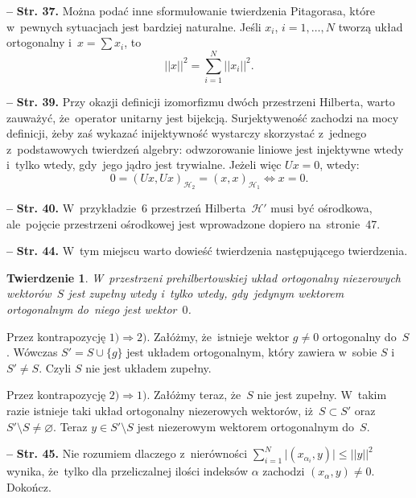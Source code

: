 \documentclass[a4paper,11pt]{article}
\newtheorem{twr}{Twierdzenie}
\let\emptyset\varnothing
\newcommand{\ld}{\ldots}
\newcommand{\mc}{\mathcal}
\newcommand{\Ra}{\Rightarrow}
\newcommand{\wtw}{wtedy i~tylko wtedy}
\newcommand{\al}{\alpha}
\newcommand{\Hc}{\mc{H}}
\newcommand{\set}[1]{\{ #1 \}}
\newcommand{\es}{\emptyset}
\newcommand{\subs}{\subset}
\newcommand{\setm}{\setminus}
\newcommand{\Sum}{\sum\limits}
\providecommand{\absj}[1]{\lvert #1 \rvert}
\newcommand{\norm}[1]{\left|\left| #1 \right|\right|}
\newcommand{\tb}{\textbf}
\newcommand{\noi}{\noindent}
\newcommand{\start}{\noi \tb{--} {}}
\newcommand{\Str}[1]{\tb{Str. #1.}}
\newcommand{\Dok}{{\color{red} Dokończ.}}
\begin{document}
\start \Str{37} Można podać inne sformułowanie twierdzenia Pitagorasa,
które w~pewnych sytuacjach jest bardziej naturalne. Jeśli $x_{ i }$,
$i = 1, \ld, N$ tworzą układ ortogonalny i~$x = \Sum x_{ i }$, to
\begin{displaymath}
  \norm{ x }^{ 2 } = \Sum_{ i = 1 }^{ N } \norm{ x_{ i } }^{ 2 }.
\end{displaymath}


\start \Str{39} Przy okazji definicji izomorfizmu dwóch przestrzeni
Hilberta, warto zauważyć, że~operator unitarny jest bijekcją.
Surjektyweność zachodzi na mocy definicji, żeby zaś wykazać
inijektywność wystarczy skorzystać z~jednego z~podstawowych twierdzeń
algebry: odwzorowanie liniowe jest injektywne \wtw, gdy~jego jądro
jest trywialne. Jeżeli więc $Ux = 0$, wtedy:
\begin{displaymath}
  0 = ( Ux, Ux )_{ \Hc_{ 2 } } = ( x, x )_{ \Hc_{ 1 } } \iff x = 0.
\end{displaymath}


\start \Str{40} W~przykładzie~6 przestrzeń Hilberta~$\Hc'$ musi być ośrodkowa, ale~pojęcie przestrzeni ośrodkowej jest wprowadzone dopiero na~stronie~47.


\start \Str{44} W~tym miejscu warto dowieść twierdzenia następującego
twierdzenia.
\begin{twr}
  W~przestrzeni prehilbertowskiej układ ortogonalny niezerowych
  wektorów~$S$ jest zupełny \wtw, gdy~jedynym wektorem ortogonalnym
  do~niego jest wektor~$0$.
\end{twr}

Przez kontrapozycję $1) \Ra 2)$. Załóżmy, że~istnieje wektor
$g \neq 0$ ortogonalny do~$S$. Wówczas $S' = S \cup \set{ g }$ jest
układem ortogonalnym, który zawiera w~sobie $S$ i~$S' \neq S$. Czyli
$S$ nie jest układem zupełny.

Przez kontrapozycję $2) \Ra 1)$. Załóżmy teraz, że~$S$ nie jest
zupełny. W~takim razie istnieje taki układ ortogonalny niezerowych
wektorów, iż~$S \subs S'$ oraz $S' \setm S \neq \es$. Teraz
$y \in S' \setm S$ jest niezerowym wektorem ortogonalnym do~$S$.

\start \Str{45} Nie rozumiem dlaczego z~nierówności
$\sum_{ i = 1 }^{ N } \absj{ ( x_{ \al_{ i } }, y ) } \leq \norm{ y
}^{ 2 }$ wynika, że~tylko dla przeliczalnej ilości indeksów $\al$
zachodzi $( x_{ \al }, y ) \neq 0$. \Dok
\end{document}
